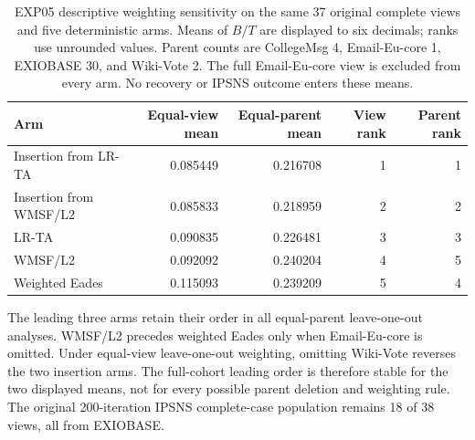 \begin{table}[htbp]
\caption{EXP05 descriptive weighting sensitivity on the same 37 original complete views and five deterministic arms. Means of $B/T$ are displayed to six decimals; ranks use unrounded values. Parent counts are CollegeMsg 4, Email-Eu-core 1, EXIOBASE 30, and Wiki-Vote 2. The full Email-Eu-core view is excluded from every arm. No recovery or IPSNS outcome enters these means.}\label{tab:s-parent}
\centering\small
\begin{tabular}{lrrrr}\toprule
Arm & Equal-view mean & Equal-parent mean & View rank & Parent rank\\\midrule
Insertion from LR-TA & 0.085449 & 0.216708 & 1 & 1\\
Insertion from WMSF/L2 & 0.085833 & 0.218959 & 2 & 2\\
LR-TA & 0.090835 & 0.226481 & 3 & 3\\
WMSF/L2 & 0.092092 & 0.240204 & 4 & 5\\
Weighted Eades & 0.115093 & 0.239209 & 5 & 4\\
\bottomrule\end{tabular}
\end{table}

The leading three arms retain their order in all equal-parent leave-one-out analyses. WMSF/L2 precedes weighted Eades only when Email-Eu-core is omitted. Under equal-view leave-one-out weighting, omitting Wiki-Vote reverses the two insertion arms. The full-cohort leading order is therefore stable for the two displayed means, not for every possible parent deletion and weighting rule. The original 200-iteration IPSNS complete-case population remains 18 of 38 views, all from EXIOBASE.
